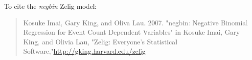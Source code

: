To cite the \emph{ negbin } Zelig model:
 \begin{verse}
 Kosuke Imai, Gary King, and Oliva Lau. 2007. "negbin: Negative Binomial Regression for Event Count Dependent Variables" in Kosuke Imai, Gary King, and Olivia Lau, "Zelig: Everyone's Statistical Software,"\url{http://gking.harvard.edu/zelig} 
\end{verse}
